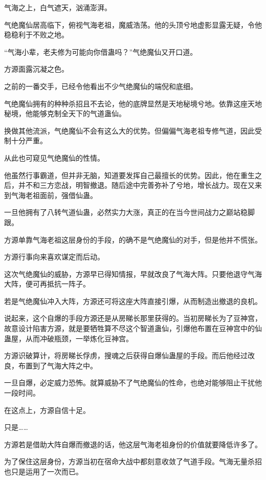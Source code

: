 
\begin{this_body}



气海之上，白气遮天，汹涌澎湃。

气绝魔仙居高临下，俯视气海老祖，魔威浩荡。他的头顶兮地虚影显露无疑，令他稳稳利于不败之地。

“气海小辈，老夫修为可能向你借蛊吗？”气绝魔仙又开口道。

方源面露沉凝之色。

之前的一番交手，已经令他看出不少气绝魔仙的端倪和底细。

气绝魔仙拥有的种种杀招且不去论，他的底牌显然是天地秘境兮地。依靠这座天地秘境，他能够克制全天下的气道蛊仙。

换做其他流派，气绝魔仙不会有这么大的优势。但偏偏气海老祖专修气道，因此受制十分严重。

从此也可窥见气绝魔仙的性情。

他虽然行事霸道，但并非无脑，知道要发挥自己最擅长的优势。因此，他在重生之后，并不和三方恋战，明智撤退。随后途中完善弥补了兮地，增长战力。现在又来到气海老祖面前，强借仙蛊。

一旦他拥有了八转气道仙蛊，必然实力大涨，真正的在当今世间战力之巅站稳脚跟。

方源单靠气海老祖这层身份的手段，的确不是气绝魔仙的对手，但是他并不慌张。

方源行事向来喜欢谋定而后动。

这次气绝魔仙的威胁，方源早已得知情报，早就改良了气海大阵。只要他退守气海大阵，便可再抵抗一阵子。

若是气绝魔仙冲入大阵，方源还可将这座大阵直接引爆，从而制造出撤退的良机。

说起来，这个自爆的手段方源还是从房睇长那里获得的。当初房睇长为了豆神宫，故意设计陷害方源，就是要牺牲算不尽这个智道蛊仙，引爆他布置在豆神宫中的仙蛊屋，从而冲破瓶颈，一举炼化豆神宫。

方源识破算计，将房睇长俘虏，搜魂之后获得自爆仙蛊屋的手段。而后他经过改良，布置到了气海大阵之中。

一旦自爆，必定威力恐怖。就算威胁不了气绝魔仙的性命，也绝对能够阻止干扰他一段时间。

在这点上，方源自信十足。

只是……

方源若是借助大阵自爆而撤退的话，他这层气海老祖身份的价值就要降低许多了。

为了保住这层身份，方源当初在宿命大战中都刻意收敛了气道手段。气海无量杀招也只是运用了一次而已。


\end{this_body}
